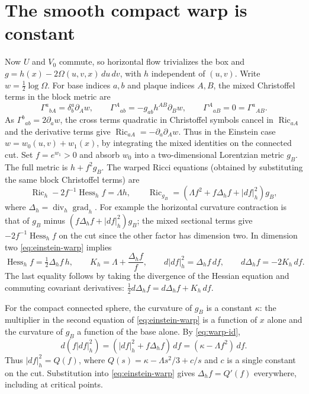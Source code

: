 \documentclass[11pt]{article}
\DeclareMathOperator{\Ric}{Ric}
\DeclareMathOperator{\Hess}{Hess}
\DeclareMathOperator{\grad}{grad}
\begin{document}
\section{The smooth compact warp is constant}

Now $U$ and $V_0$ commute, so horizontal flow trivializes the box
and $g=h(x)-2\Omega(u,v,x)\,du\,dv$, with $h$ independent of $(u,v)$.
Write $w=\tfrac12\log\Omega$. For base indices $a,b$ and plaque
indices $A,B$, the mixed Christoffel terms in the block metric are
\[
 \Gamma^a{}_{bA}=\delta^a_b\partial_A w,\qquad
 \Gamma^A{}_{ab}=-g_{ab}h^{AB}\partial_B w,\qquad
 \Gamma^A{}_{aB}=0=\Gamma^a{}_{AB}.
\]
As $\Gamma^b{}_{ab}=2\partial_a w$, the cross terms quadratic in
Christoffel symbols cancel in $\Ric_{aA}$ and the derivative terms
give $\Ric_{aA}=-\partial_a\partial_A w$. Thus in the Einstein
case $w=w_0(u,v)+w_1(x)$, by integrating the mixed identities on
the connected cut. Set $f=e^{w_1}>0$ and absorb $w_0$ into a
two-dimensional Lorentzian metric $g_B$. The full metric is
$h+f^2g_B$. The warped Ricci equations (obtained by substituting
the same block Christoffel terms) are
\begin{equation}\label{eq:einstein-warp}
 \Ric_h-2f^{-1}\Hess_h f=\Lambda h,\qquad
 \Ric_{g_B}=(\Lambda f^2+f\Delta_h f+|df|_h^2)g_B ,
\end{equation}
where $\Delta_h=\operatorname{div}_h\grad_h$. For example the
horizontal curvature contraction is that of $g_B$ minus
$(f\Delta_h f+|df|_h^2)g_B$; the mixed sectional terms give
$-2f^{-1}\Hess_h f$ on the cut since the other factor has dimension
two. In dimension two \eqref{eq:einstein-warp} implies
\begin{equation}\label{eq:warp-id}
 \Hess_h f=\tfrac12\Delta_h f\,h,\qquad
 K_h=\Lambda+\frac{\Delta_h f}{f},\qquad
 d|df|_h^2=\Delta_h f\,df,\qquad d\Delta_h f=-2K_h\,df .
\end{equation}
The last equality follows by taking the divergence of the Hessian
equation and commuting covariant derivatives:
$\tfrac12 d\Delta_h f=d\Delta_h f+K_h\,df$.

For the compact connected sphere, the curvature of $g_B$ is a
constant $\kappa$: the multiplier in the second equation of
\eqref{eq:einstein-warp} is a function of $x$ alone and the curvature
of $g_B$ a function of the base alone. By \eqref{eq:warp-id},
\[
 d(f|df|_h^2)=(|df|_h^2+f\Delta_h f)\,df
              =(\kappa-\Lambda f^2)\,df.
\]
Thus $|df|_h^2=Q(f)$, where $Q(s)=\kappa-\Lambda s^2/3+c/s$
and $c$ is a single constant on the cut. Substitution into
\eqref{eq:einstein-warp} gives $\Delta_h f=Q'(f)$ everywhere,
including at critical points.
\end{document}
